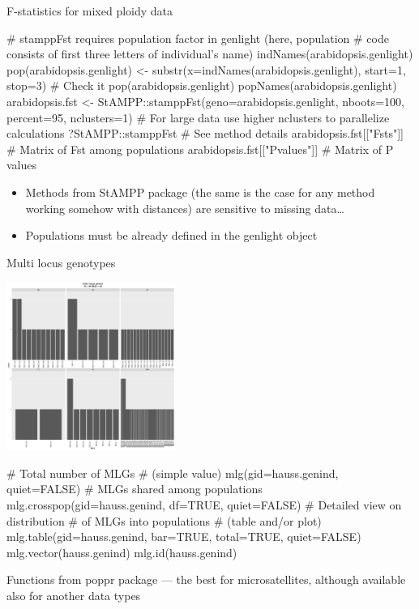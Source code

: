 \documentclass[compress, ucs, xelatex, 11pt, xcolor=svgnames,
  hyperref={
    bookmarks=true,
    unicode=true,
    colorlinks=true,
    pdftitle={Molecular data in R},
    plainpages=false,
    pdfauthor={Vojtech Zeisek},
    pdfsubject={Course about phylogeny and evolution in R},
    pdfcreator={XeLaTeX},
    pdfkeywords={R, evolution, phylogeny, molecular data},
    linkcolor=Tomato,
    anchorcolor=SaddleBrown,
    citecolor=Goldenrod,
    filecolor=DarkMagenta,
    menucolor=Sienna,
    urlcolor=DarkTurquoise,
    pdftex},
  url={hyphens, lowtilde} %
  ]{beamer}
\begin{document}
\begin{frame}[fragile]{F-statistics for mixed ploidy data}
  \begin{spluscode}
    # stamppFst requires population factor in genlight (here, population
    # code consists of first three letters of individual's name)
    indNames(arabidopsis.genlight)
    pop(arabidopsis.genlight) <- substr(x=indNames(arabidopsis.genlight),
      start=1, stop=3)
    # Check it
    pop(arabidopsis.genlight)
    popNames(arabidopsis.genlight)
    arabidopsis.fst <- StAMPP::stamppFst(geno=arabidopsis.genlight,
      nboots=100, percent=95, nclusters=1)
    # For large data use higher nclusters to parallelize calculations
    ?StAMPP::stamppFst # See method details
    arabidopsis.fst[["Fsts"]] # Matrix of Fst among populations
    arabidopsis.fst[["Pvalues"]] # Matrix of P values
  \end{spluscode}
  \begin{itemize}
    \item Methods from StAMPP package (the same is the case for any method working somehow with distances) are sensitive to missing data\ldots
    \item Populations must be already defined in the genlight object
  \end{itemize}
\end{frame}


\begin{frame}[fragile]{Multi locus genotypes}
  \begin{multicols}{2}
  \includegraphics[height=5.5cm]{mlg.png}
  \begin{spluscode}
    # Total number of MLGs
    # (simple value)
    mlg(gid=hauss.genind, quiet=FALSE)
    # MLGs shared among populations
    mlg.crosspop(gid=hauss.genind,
      df=TRUE, quiet=FALSE)
    # Detailed view on distribution
    # of MLGs into populations
    # (table and/or plot)
    mlg.table(gid=hauss.genind,
      bar=TRUE, total=TRUE,
      quiet=FALSE)
    mlg.vector(hauss.genind)
    mlg.id(hauss.genind)
  \end{spluscode}
  \end{multicols}
  Functions from poppr package --- the best for microsatellites, although available also for another data types
\end{frame}
\end{document}
